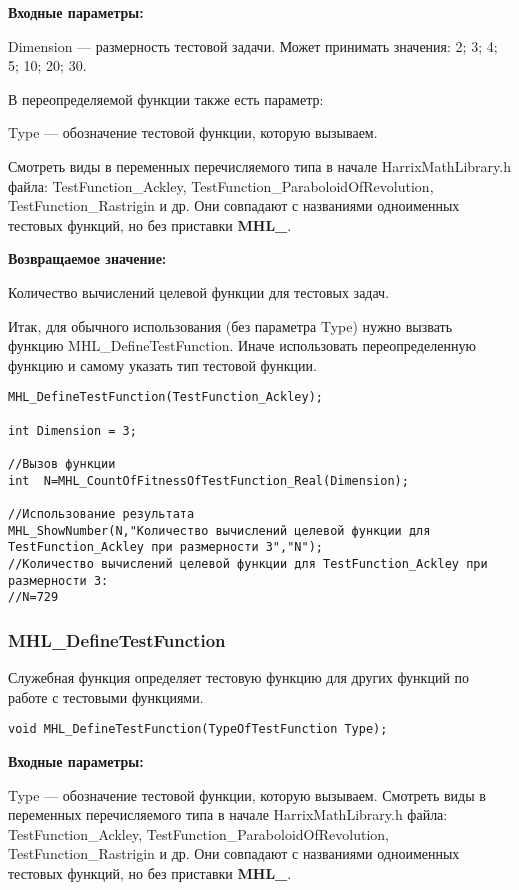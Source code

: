 \documentclass[a4paper,12pt]{article}
\begin{document}
\textbf{Входные параметры:}

Dimension --- размерность тестовой задачи. Может принимать значения: 2; 3; 4; 5; 10; 20; 30.

В переопределяемой функции также есть параметр:
  
Type --- обозначение тестовой функции, которую вызываем. 

Смотреть виды в переменных перечисляемого типа в начале HarrixMathLibrary.h файла: TestFunction\_Ackley, TestFunction\_ParaboloidOfRevolution, TestFunction\_Rastrigin и др. Они совпадают с названиями одноименных тестовых функций, но без приставки \textbf{MHL\_}.

\textbf{Возвращаемое значение:}
 
Количество вычислений целевой функции для тестовых задач.

Итак, для обычного использования (без параметра Type) нужно вызвать функцию MHL\_DefineTestFunction. Иначе использовать переопределенную функцию и самому указать тип тестовой функции.


\begin{lstlisting}[label=code_use_MHL_CountOfFitnessOfTestFunction_Real,caption=Пример использования]
MHL_DefineTestFunction(TestFunction_Ackley);

int Dimension = 3;

//Вызов функции
int  N=MHL_CountOfFitnessOfTestFunction_Real(Dimension);

//Использование результата
MHL_ShowNumber(N,"Количество вычислений целевой функции для TestFunction_Ackley при размерности 3","N");
//Количество вычислений целевой функции для TestFunction_Ackley при размерности 3:
//N=729
\end{lstlisting}

\subsubsection{MHL\_DefineTestFunction}\label{MHL_DefineTestFunction}

Служебная функция определяет тестовую функцию для других функций по работе с тестовыми функциями.


\begin{lstlisting}[label=code_syntax_MHL_DefineTestFunction,caption=Синтаксис]
void MHL_DefineTestFunction(TypeOfTestFunction Type);
\end{lstlisting}

\textbf{Входные параметры:}
  
Type --- обозначение тестовой функции, которую вызываем.
Смотреть виды в переменных перечисляемого типа в начале HarrixMathLibrary.h файла: TestFunction\_Ackley, TestFunction\_ParaboloidOfRevolution, TestFunction\_Rastrigin и др. Они совпадают с названиями одноименных тестовых функций, но без приставки \textbf{MHL\_}.
\end{document}

